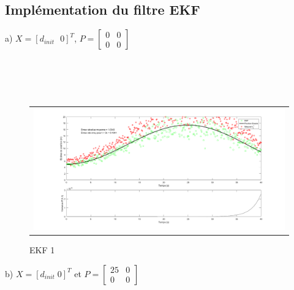 \documentclass[11pt]{article}		%
\begin{document}
\subsection{Implémentation du filtre EKF}

\noindent a) $X=[d_{init} \mbox{ }0]^T$, $P=\begin{bmatrix}0 &0\\0 & 0\end{bmatrix}$ \\ \\ \\  \\  \\

\vspace{-0.3in}
\label{EKF}
\begin{figure}[ht]
 \begin{center}
  \begin{tabular}{c}
    \includegraphics[width=1.0\textwidth]{ekf1.png} 
  \end{tabular}
 \end{center}
 \vspace{-0.3in}
 \caption{EKF 1}
 \label{EKF1}
\end{figure}

\noindent b) $X = [d_{init}\; 0]^T$ et $P = \begin{bmatrix}25 & 0\\0 & 0\end{bmatrix}$\\ \\ \\
\end{document}

